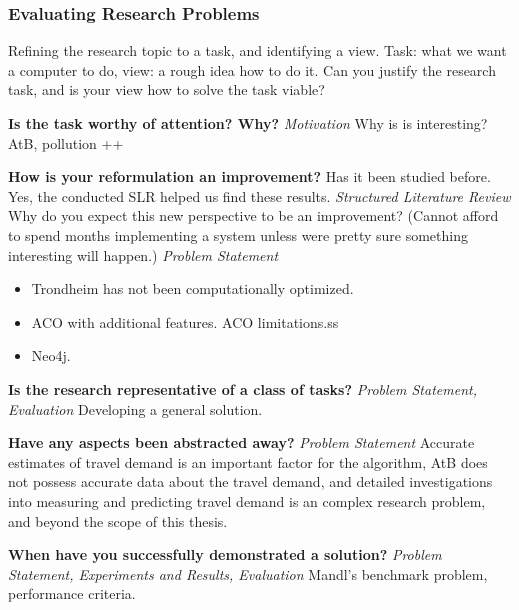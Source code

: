 \subsubsection{Evaluating Research Problems}

Refining the research topic to a task, and identifying a view.
Task: what we want a computer to do, view: a rough idea how to do it. Can you justify the research task, and is your view how to solve the task viable? 

\textbf{Is the task worthy of attention? Why?}
\emph{\color{orange} Motivation}
Why is is interesting? AtB, pollution ++ 

\textbf{How is your reformulation an improvement?}
Has it been studied before. Yes, the conducted SLR helped us find these results.\emph{\color{orange} Structured Literature Review}
Why do you expect this new perspective to be an improvement? (Cannot afford to spend months implementing a system unless were pretty sure something interesting will happen.)\emph{\color{orange} Problem Statement}
\begin{itemize}
\item Trondheim has not been computationally optimized.
\item ACO with additional features. ACO limitations.ss
\item Neo4j.
\end{itemize}

\textbf{Is the research representative of a class of tasks?}
\emph{\color{orange} Problem Statement, Evaluation}
Developing a general solution.

\textbf{Have any aspects been abstracted away?}
\emph{\color{orange} Problem Statement}
Accurate estimates of travel demand is an important factor for the algorithm, AtB does not possess accurate data about the travel demand, and detailed investigations into measuring and predicting travel demand is an complex research problem, and beyond the scope of this thesis. 

\textbf{When have you successfully demonstrated a solution?}
\emph{\color{orange} Problem Statement, Experiments and Results, Evaluation}
Mandl's benchmark problem, performance criteria.